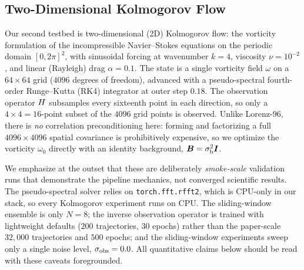 \subsection{Two-Dimensional Kolmogorov Flow}
\label{sec:results-kflow}

Our second testbed is two-dimensional (2D) Kolmogorov flow: the vorticity formulation of the incompressible Navier--Stokes equations on the periodic domain $[0,2\pi]^2$, with sinusoidal forcing at wavenumber $k=4$, viscosity $\nu=10^{-2}$, and linear (Rayleigh) drag $\alpha=0.1$. The state is a single vorticity field $\omega$ on a $64\times64$ grid ($4096$ degrees of freedom), advanced with a pseudo-spectral fourth-order Runge--Kutta (RK4) integrator at outer step $0.18$. The observation operator $H$ subsamples every sixteenth point in each direction, so only a $4\times4=16$-point subset of the $4096$ grid points is observed. Unlike Lorenz-96, there is \emph{no} correlation preconditioning here: forming and factorizing a full $4096\times4096$ spatial covariance is prohibitively expensive, so we optimize the vorticity $\omega_0$ directly with an identity background, $\bm{B}=\sigma_{\mathrm{b}}^2\bm{I}$.

We emphasize at the outset that these are deliberately \emph{smoke-scale} validation runs that demonstrate the pipeline mechanics, not converged scientific results. The pseudo-spectral solver relies on \texttt{torch.fft.rfft2}, which is CPU-only in our stack, so every Kolmogorov experiment runs on CPU. The sliding-window ensemble is only $N=8$; the inverse observation operator is trained with lightweight defaults ($200$ trajectories, $30$ epochs) rather than the paper-scale $32{,}000$ trajectories and $500$ epochs; and the sliding-window experiments sweep only a single noise level, $\sigma_{\mathrm{obs}}=0.0$. All quantitative claims below should be read with these caveats foregrounded.

